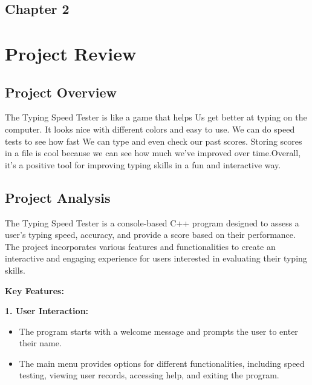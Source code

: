 \begin{center}
    \section*{\fontsize{20}{20}\selectfont Chapter 2}
\end{center}



\vspace{10mm}
\section{Project Review}
\subsection{Project Overview}

The Typing Speed Tester is like a game that helps Us get better at typing on the computer. It looks nice with different colors and easy to use. We can do speed tests to see how fast We can type and even check our past scores. Storing scores in a file is cool because we can see how much we've improved over time.Overall, it's a positive tool for improving typing skills in a fun and interactive way. 


\subsection{Project Analysis}
The Typing Speed Tester is a console-based C++ program designed to assess a user's typing speed, accuracy, and provide a score based on their performance. The project incorporates various features and functionalities to create an interactive and engaging experience for users interested in evaluating their typing skills.
\vspace{5mm}

\begin{Large}
\textbf{Key Features:}
\end{Large}%

\vspace{5mm}

\textbf{ 1. User Interaction:}

\begin{itemize}
    \item The program starts with a welcome message and prompts the user to enter their name.
    \item The main menu provides options for different functionalities, including speed testing, viewing user records, accessing help, and exiting the program.
\end{itemize}

